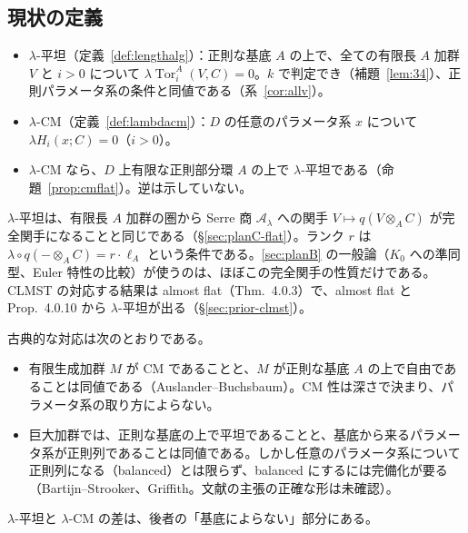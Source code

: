 \documentclass[11pt,a4paper]{ltjsarticle}
\numberwithin{equation}{section}
\theoremstyle{plain}
\theoremstyle{definition}
\theoremstyle{definition}
\newcommand{\Tor}{\operatorname{Tor}}
\begin{document}
\subsection{現状の定義}
\begin{itemize}
  \item $\lambda$-平坦（定義~\ref{def:lengthalg}）：正則な基底 $A$ の上で、全ての有限長 $A$ 加群 $V$ と $i>0$ について $\lambda\Tor_i^A(V,C)=0$。$k$ で判定でき（補題~\ref{lem:34}）、正則パラメータ系の条件と同値である（系~\ref{cor:allv}）。
  \item $\lambda$-CM（定義~\ref{def:lambdacm}）：$D$ の任意のパラメータ系 $x$ について $\lambda H_i(x;C)=0$（$i>0$）。
  \item $\lambda$-CM なら、$D$ 上有限な正則部分環 $A$ の上で $\lambda$-平坦である（命題~\ref{prop:cmflat}）。逆は示していない。
\end{itemize}
$\lambda$-平坦は、有限長 $A$ 加群の圏から Serre 商 $\mathcal{A}_\lambda$ への関手 $V\mapsto q(V\otimes_A C)$ が完全関手になることと同じである（\S\ref{sec:planC-flat}）。ランク $r$ は $\lambda\circ q(-\otimes_A C) = r\cdot\ell_A$ という条件である。\ref{sec:planB} の一般論（$K_0$ への準同型、Euler 特性の比較）が使うのは、ほぼこの完全関手の性質だけである。CLMST の対応する結果は almost flat（Thm.~4.0.3）で、almost flat と Prop.~4.0.10 から $\lambda$-平坦が出る（\S\ref{sec:prior-clmst}）。

古典的な対応は次のとおりである。
\begin{itemize}
  \item 有限生成加群 $M$ が CM であることと、$M$ が正則な基底 $A$ の上で自由であることは同値である（Auslander--Buchsbaum）。CM 性は深さで決まり、パラメータ系の取り方によらない。
  \item 巨大加群では、正則な基底の上で平坦であることと、基底から来るパラメータ系が正則列であることは同値である。しかし任意のパラメータ系について正則列になる（balanced）とは限らず、balanced にするには完備化が要る（Bartijn--Strooker、Griffith。文献の主張の正確な形は未確認）。
\end{itemize}
$\lambda$-平坦と $\lambda$-CM の差は、後者の「基底によらない」部分にある。
\end{document}
